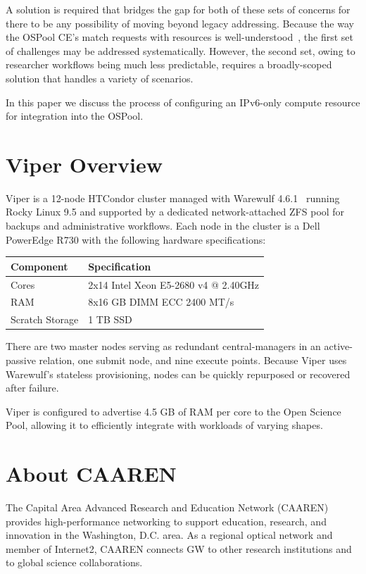 \documentclass[11pt]{article}
\begin{document}
A solution is required that bridges the gap for both of these sets of concerns for there to be any possibility of moving beyond legacy addressing. Because the way the OSPool CE's match requests with resources is well-understood~\cite{ospooldocs}, the first set of challenges may be addressed systematically. However, the second set, owing to researcher workflows being much less predictable, requires a broadly-scoped solution that handles a variety of scenarios. 

In this paper we discuss the process of configuring an IPv6-only compute resource for integration into the OSPool.

\section{Viper Overview}

Viper is a 12-node HTCondor cluster managed with Warewulf 4.6.1~\cite{warewulf} running Rocky Linux 9.5 and supported by a dedicated network-attached ZFS pool for backups and administrative workflows.  Each node in the cluster is a Dell PowerEdge R730 with the following hardware specifications:

\begin{center}
\small
\begin{tabular}{|l|l|}
\hline
\textbf{Component} & \textbf{Specification} \\
\hline
Cores & 2x14 Intel Xeon E5-2680 v4 @ 2.40GHz\\
RAM & 8x16 GB DIMM ECC 2400 MT/s \\
Scratch Storage & 1 TB SSD \\
\hline
\end{tabular}
\end{center}
There  are two master nodes serving as redundant central-managers in an active-passive relation, one
submit node, and nine execute points. Because Viper uses Warewulf's stateless provisioning, nodes can be quickly repurposed or recovered after failure.

Viper is configured to advertise 4.5 GB of RAM per core to the Open Science Pool, allowing it to efficiently integrate with workloads of varying shapes.  

\section{About CAAREN}

The Capital Area Advanced Research and Education Network (CAAREN) provides high-performance networking to support education, research, and innovation in the Washington, D.C. area. As a regional optical network and member of Internet2, CAAREN connects GW to other research institutions and to global science collaborations.
\newline
\end{document}
